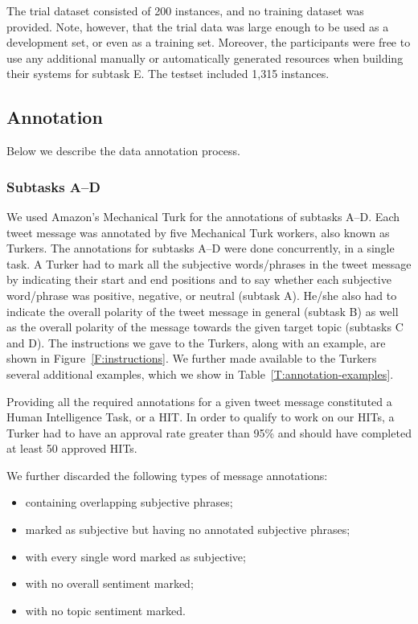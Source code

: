 \documentclass[11pt]{article}
\begin{document}
The trial dataset consisted of 200 instances, and no training dataset was provided.
Note, however, that the trial data was large enough to be used as a development set,
or even as a training set.
Moreover, the participants were free to use any additional manually or automatically generated resources when building their systems for subtask E.
The testset included 1,315 instances.


\subsection{Annotation}

Below we describe the data annotation process.

\subsubsection{Subtasks A--D}

We used Amazon's Mechanical Turk for the annotations of subtasks A--D.
Each tweet message was annotated by five Mechanical Turk workers, also known as Turkers. The annotations for subtasks A--D were done concurrently, in a single task. A Turker had to mark all the subjective words/phrases in the tweet message by indicating their start and end positions and to say whether each subjective word/phrase was positive, negative, or neutral (subtask A). He/she also had to indicate the overall polarity of the tweet message in general (subtask B) as well as the overall polarity of the message towards the given target topic (subtasks C and D). The instructions we gave to the Turkers, along with an example,
are shown in Figure~\ref{F:instructions}.
We further made available to the Turkers several additional examples,
which we show in Table~\ref{T:annotation-examples}.

Providing all the required annotations for a given tweet message
constituted a Human Intelligence Task, or a HIT.
In order to qualify to work on our HITs, a Turker had to have an approval rate greater than 95\% and should have completed at least 50 approved HITs.

We further discarded the following types of message annotations:

\begin{itemize}[noitemsep]
	\item containing overlapping subjective phrases;
	\item marked as subjective but having no annotated subjective phrases;
	\item with every single word marked as subjective;
	\item with no overall sentiment marked;
	\item with no topic sentiment marked.
\end{itemize}
\end{document}
